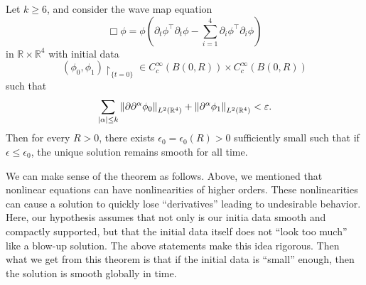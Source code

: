 \documentclass{article}
\begin{document}
\begin{theorem}
	Let $k \geq 6$, and consider the wave map equation 
	\begin{equation*}
		\Box\phi = \phi\left(\partial_{t}\phi^{\top}\partial_{t}\phi - \sum_{i = 1}^{4}\partial_{i}\phi^{\top}\partial_{i}\phi\right)
	\end{equation*} 
	in $\mathbb{R} \times \mathbb{R}^{4}$ with initial data  
	\begin{equation*}
		(\phi_{0}, \phi_{1})\upharpoonright_{\{t  = 0\}} \in C_{c}^{\infty}(B(0,R)) \times C_{c}^{\infty}(B(0,R)) 
	\end{equation*} 
	such that 
	\begin{equation*}
		\sum_{|\alpha|\leq k}\left\Vert \partial\partial^{\alpha}\phi_{0} \right\Vert_{L^{2}(\mathbb{R}^{4})} + \left\Vert \partial^{\alpha}\phi_{1} \right\Vert_{L^{2}(\mathbb{R}^{4})} < \varepsilon. 
	\end{equation*} 
	Then for every $R > 0$, there exists $\epsilon_{0} = \epsilon_{0}(R) > 0$ sufficiently small such that if $\epsilon \leq \epsilon_{0}$, the unique solution remains smooth for all time. 
\end{theorem} 
We can make sense of the theorem as follows. Above, we mentioned that nonlinear equations can have nonlinearities of higher orders. These nonlinearities can cause a solution to quickly lose ``derivatives'' leading to undesirable behavior. Here, our hypothesis assumes that not only is our initia data smooth and compactly supported, but that the initial data itself does not ``look too much'' like a blow-up solution. The above statements make this idea rigorous. Then what we get from this theorem is that if the initial data is ``small'' enough, then the solution is smooth globally in time. 
\end{document}
